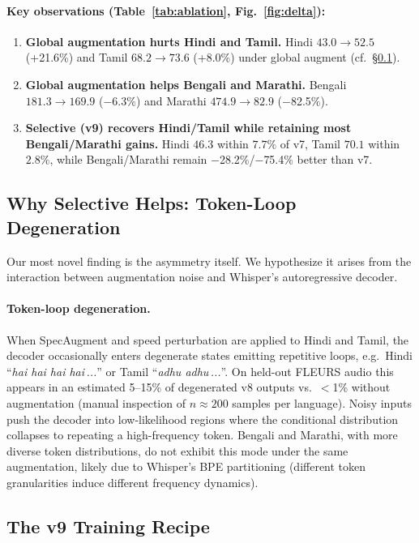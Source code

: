 \documentclass[11pt,a4paper]{article}
\begin{document}
\paragraph{Key observations (Table~\ref{tab:ablation}, Fig.~\ref{fig:delta}):}
\begin{enumerate}[leftmargin=1.2em, itemsep=2pt]
  \item \textbf{Global augmentation hurts Hindi and Tamil.} Hindi $43.0\to52.5$ (+21.6\%) and Tamil $68.2\to73.6$ (+8.0\%) under global augment (cf.\ \S\ref{sec:degen}).
  \item \textbf{Global augmentation helps Bengali and Marathi.} Bengali $181.3\to169.9$ ($-$6.3\%) and Marathi $474.9\to82.9$ ($-$82.5\%).
  \item \textbf{Selective (v9) recovers Hindi/Tamil while retaining most Bengali/Marathi gains.}
    Hindi $46.3$ within $7.7\%$ of v7, Tamil $70.1$ within $2.8\%$, while
    Bengali/Marathi remain $-$28.2\%/$-$75.4\% better than v7.
\end{enumerate}

\subsection{Why Selective Helps: Token-Loop Degeneration}
\label{sec:degen}

Our most novel finding is the asymmetry itself.
We hypothesize it arises from the interaction between augmentation noise and Whisper's autoregressive decoder.

\paragraph{Token-loop degeneration.}
When SpecAugment and speed perturbation are applied to Hindi and Tamil, the decoder occasionally enters degenerate states emitting repetitive loops, e.g.\ Hindi ``\textit{hai hai hai hai\,...}'' or Tamil ``\textit{adhu adhu\,...}''.
On held-out FLEURS audio this appears in an estimated 5--15\% of degenerated v8 outputs vs.\ $<$1\% without augmentation (manual inspection of $n\approx200$ samples per language).
Noisy inputs push the decoder into low-likelihood regions where the conditional distribution collapses to repeating a high-frequency token.
Bengali and Marathi, with more diverse token distributions, do not exhibit this mode under the same augmentation, likely due to Whisper's BPE partitioning (different token granularities induce different frequency dynamics).

\subsection{The v9 Training Recipe}
\end{document}
